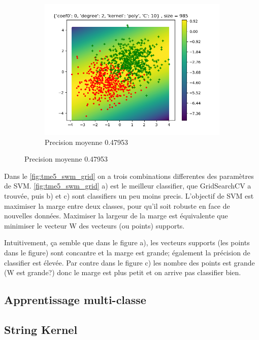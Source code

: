 \documentclass[a4paper,12pt]{article}
\begin{document}
\begin{figure}[h!]
\begin{subfigure}{.33\textwidth}
  \centering
	\includegraphics[width=\linewidth]{images/tme5/grid_arti3.png}
	\caption{Precision moyenne 0.47953}
\end{subfigure}
\end{figure}

Dans le \autoref{fig:tme5_swm_grid} on a trois combinations differentes des paramètres de SVM. \autoref{fig:tme5_swm_grid} a)
est le meilleur classifier, que GridSearchCV a trouvée, puis b) et c) sont classifiers un peu moins precis.
L'objectif de SVM est maximiser la marge entre deux classes, pour qu'il soit robuste en face de nouvelles données.
Maximiser la largeur de la marge est équivalente que minimiser le vecteur W des vecteurs (ou points) supports.

Intuitivement, ça semble que dans le figure a), les vecteurs supports (les points dans le figure) sont concantre et la marge est grande; également la précision de classifier est élevée.
Par contre dans le figure c) les nombre des points est grande (W est grande?) donc le marge est plus petit et on arrive pas
classifier bien.

\subsection{Apprentissage multi-classe}

\subsection{String Kernel}



\end{document}
